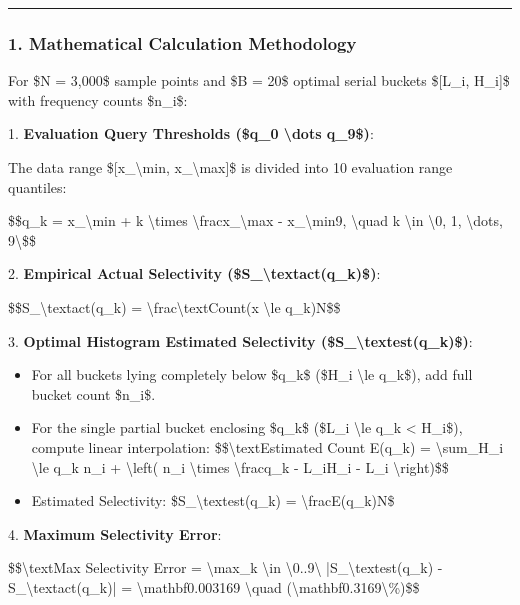 \documentclass[11pt,a4paper]{article}
\begin{document}
\hrule


\subsubsection{1. Mathematical Calculation Methodology}

For \$N = 3,000\$ sample points and \$B = 20\$ optimal serial buckets \$[L\_i, H\_i]\$ with frequency counts \$n\_i\$:


1. \textbf{Evaluation Query Thresholds (\$q\_0 \textbackslash{}dots q\_9\$)}:

The data range \$[x\_{\textbackslash{}min}, x\_{\textbackslash{}max}]\$ is divided into 10 evaluation range quantiles:

\$\$q\_k = x\_{\textbackslash{}min} + k \textbackslash{}times \textbackslash{}frac{x\_{\textbackslash{}max} - x\_{\textbackslash{}min}}{9}, \textbackslash{}quad k \textbackslash{}in \textbackslash{}{0, 1, \textbackslash{}dots, 9\textbackslash{}}\$\$


2. \textbf{Empirical Actual Selectivity (\$S\_{\textbackslash{}text{act}}(q\_k)\$)}:

\$\$S\_{\textbackslash{}text{act}}(q\_k) = \textbackslash{}frac{\textbackslash{}text{Count}(x \textbackslash{}le q\_k)}{N}\$\$


3. \textbf{Optimal Histogram Estimated Selectivity (\$S\_{\textbackslash{}text{est}}(q\_k)\$)}:

\begin{itemize}
\item For all buckets lying completely below \$q\_k\$ (\$H\_i \textbackslash{}le q\_k\$), add full bucket count \$n\_i\$.
\item For the single partial bucket enclosing \$q\_k\$ (\$L\_i \textbackslash{}le q\_k < H\_i\$), compute linear interpolation:
\$\$\textbackslash{}text{Estimated Count } E(q\_k) = \textbackslash{}sum\_{H\_i \textbackslash{}le q\_k} n\_i + \textbackslash{}left( n\_i \textbackslash{}times \textbackslash{}frac{q\_k - L\_i}{H\_i - L\_i} \textbackslash{}right)\$\$

\item Estimated Selectivity: \$S\_{\textbackslash{}text{est}}(q\_k) = \textbackslash{}frac{E(q\_k)}{N}\$
\end{itemize}

4. \textbf{Maximum Selectivity Error}:

\$\$\textbackslash{}text{Max Selectivity Error} = \textbackslash{}max\_{k \textbackslash{}in \textbackslash{}{0..9\textbackslash{}}} |S\_{\textbackslash{}text{est}}(q\_k) - S\_{\textbackslash{}text{act}}(q\_k)| = \textbackslash{}mathbf{0.003169} \textbackslash{}quad (\textbackslash{}mathbf{0.3169\textbackslash{}\%})\$\$
\end{document}
